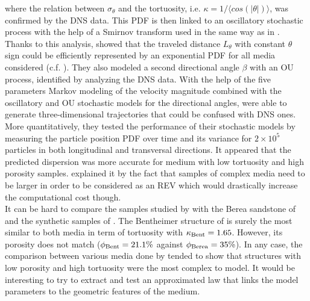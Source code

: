 where the relation between $\sigma_\theta$ and the tortuosity, i.e. $\kappa=1/\langle cos(|\theta|)\rangle$, was confirmed by the DNS data. This PDF is then linked to an oscillatory stochastic process with the help of a Smirnov transform used in the same way as in \citet{Puyguiraud2019}. \\
Thanks to this analysis, \citeauthor{Meyer2016} showed that the traveled distance $L_\theta$ with constant $\theta$ sign could be efficiently represented by an exponential PDF for all media considered (c.f. \citet[Fig- 12]{Meyer2016}). They also modeled a second directional angle $\beta$ with an OU process, identified by analyzing the DNS data.
With the help of the five parameters Markov modeling of the velocity magnitude combined with the oscillatory and OU stochastic models for the directional angles, \citet{Meyer2016} were able to generate three-dimensional trajectories that could be confused with DNS ones. \\
More quantitatively, they tested the performance of their stochastic models by measuring the particle position PDF over time and its variance for $2\times 10^5$ particles in both longitudinal and transversal directions.
It appeared that the predicted dispersion was more accurate for medium with low tortuosity and high porosity samples. 
\cite{Meyer2016} explained it by the fact that samples of complex media need to be larger in order to be considered as an REV which would drastically increase the computational cost though.\\

It can be hard to compare the samples studied by \citeauthor{Meyer2016} with the Berea sandstone of \citet{Dentz2017} and the synthetic samples of \citet{Puyguiraud2019}. 
The Bentheimer structure of \citet{Meyer2016} is surely the most similar to both media in term of tortuosity with $\kappa_{\rm{Bent}}=1.65$. 
However, its porosity does not match ($\phi_{\rm{Bent}}=21.1\%$ against $\phi_{\rm{Berea}}=35\%$).
In any case, the comparison between various media done by \citet{Meyer2016} tended to show that structures with low porosity and high tortuosity were the most complex to model. 
It would be interesting to try to extract and test an approximated law that links the model parameters to the geometric features of the medium.\\

